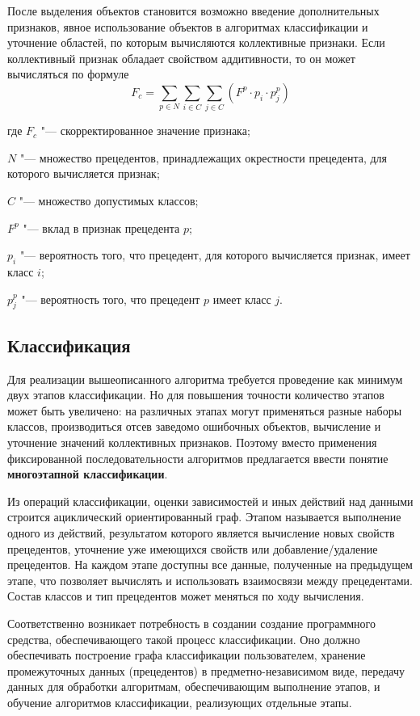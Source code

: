 После выделения объектов становится возможно введение дополнительных признаков, явное использование объектов в алгоритмах классификации и уточнение областей, по которым вычисляются коллективные признаки. Если коллективный признак обладает свойством аддитивности, то он может вычисляться по формуле
$$
F_c=\sum_{p \in N}\sum_{i \in C}\sum_{j \in C}(F^p \cdot p_i \cdot p_j^p)
$$
\begin{ESKDexplanation}
\item[где ] $F_c$ "--- скорректированное значение признака;
\item $N$ "--- множество прецедентов, принадлежащих окрестности прецедента, для которого вычисляется признак;
\item $C$ "--- множество допустимых классов;
\item $F^p$ "--- вклад в признак прецедента $p$;
\item $p_i$ "--- вероятность того, что прецедент, для которого вычисляется признак, имеет класс $i$;
\item $p_j^p$ "--- вероятность того, что прецедент $p$ имеет класс $j$.
\end{ESKDexplanation}

\subsection{Классификация}

Для реализации вышеописанного алгоритма требуется проведение как минимум двух этапов классификации. Но для повышения точности количество этапов может быть увеличено: на различных этапах могут применяться разные наборы классов, производиться отсев заведомо ошибочных объектов, вычисление и уточнение значений коллективных признаков. Поэтому вместо применения фиксированной последовательности алгоритмов предлагается ввести понятие \textbf{многоэтапной классификации}. 

Из операций классификации, оценки зависимостей и иных действий над данными строится ациклический ориентированный граф. Этапом называется выполнение одного из действий, результатом которого является вычисление новых свойств прецедентов, уточнение уже имеющихся свойств или добавление/удаление прецедентов. На каждом этапе доступны все данные, полученные на предыдущем этапе, что позволяет вычислять и использовать взаимосвязи между прецедентами. Состав классов и тип прецедентов может меняться по ходу вычисления.

Соответственно возникает потребность в создании создание программного средства, обеспечивающего такой процесс классификации. Оно должно обеспечивать построение графа классификации пользователем, хранение промежуточных данных (прецедентов) в предметно-независимом виде, передачу данных для обработки алгоритмам, обеспечивающим выполнение этапов, и обучение алгоритмов классификации, реализующих отдельные этапы.

